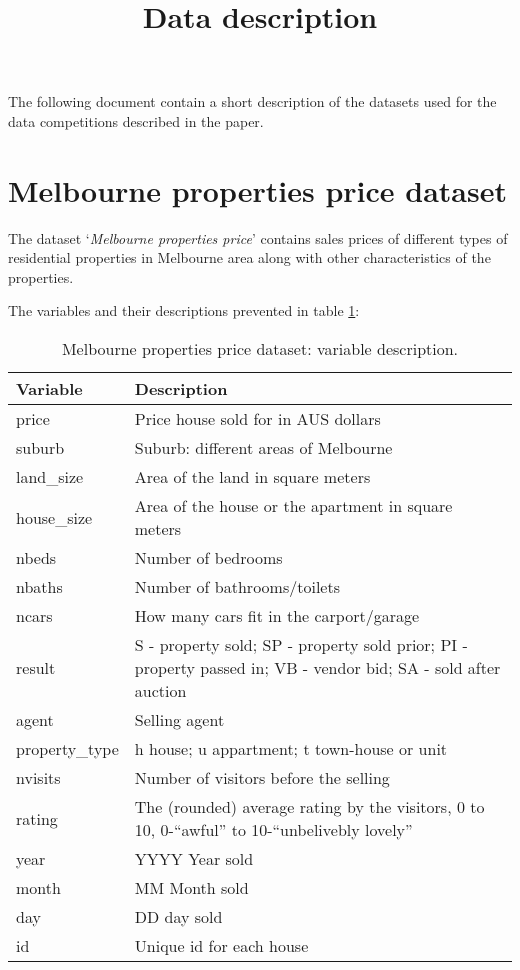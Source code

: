 \documentclass{article}
\begin{document}
\title{Data description}

\maketitle


The following document contain a short description of the datasets used for the data competitions described in the paper.

\section{Melbourne properties price dataset}

The dataset `\textit{Melbourne properties price}' contains sales prices of different types of residential properties in Melbourne area along with other characteristics of the properties. 

The variables and their descriptions prevented in table \ref{tab:Melb_price}:

\begin{table}[h]
	\begin{center}
		\renewcommand{\arraystretch}{1.1}
		\begin{tabular}{p{2cm} p{9.5cm}} \hline
			Variable   				& Description       \\\hline
			price 		& Price house sold for in AUS dollars\\
			suburb 		& Suburb: different areas of Melbourne\\
			land\_size  & Area of the land in square meters \\
			house\_size & Area of the house or the apartment in square meters\\
			nbeds 		& Number of bedrooms\\
			nbaths 		& Number of bathrooms/toilets\\
			ncars 		& How many cars fit in the carport/garage\\
			result 		& S - property sold; SP - property sold prior; PI - property passed in; VB - vendor bid; SA - sold after auction\\
			agent 		& Selling agent\\
			property\_type & h house; u appartment; t town-house or unit \\
			nvisits 	& Number of visitors before the selling\\
			rating 		& The (rounded) average rating by the visitors, 0 to 10, 0-``awful'' to 10-``unbelivebly lovely'' \\
			year 		& YYYY Year sold \\
			month 		& MM Month sold\\
			day 		& DD day sold\\
			id 			& Unique id for each house \\\hline
		
	\end{tabular}
	\caption{Melbourne properties price dataset: variable description.}
\end{center}
\label{tab:Melb_price}
\end{table}
\end{document}
